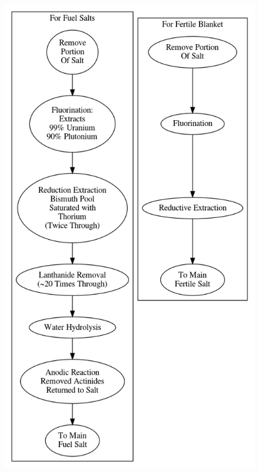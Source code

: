 \documentclass[letterpaper]{article}
\begin{document}
\begin{figure}[H]
  \centering
  \includegraphics[height=.5\textheight]{figures/msfr-proc.png}
  \label{fig:figH}
\end{figure}
\end{document}
